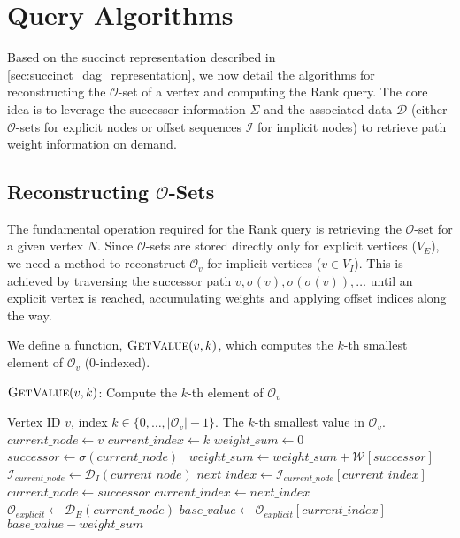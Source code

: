 \section{Query Algorithms}
\label{sec:query_algorithms}


Based on the succinct representation described in \autoref{sec:succinct_dag_representation}, we now detail the algorithms for reconstructing the $\mathcal{O}$-set of a vertex and computing the Rank query. The core idea is to leverage the successor information $\Sigma$ and the associated data $\mathcal{D}$ (either $\mathcal{O}$-sets for explicit nodes or offset sequences $\mathcal{I}$ for implicit nodes) to retrieve path weight information on demand.

\subsection{Reconstructing $\mathcal{O}$-Sets}
\label{subsec:reconstructing_o_sets}

The fundamental operation required for the Rank query is retrieving the $\mathcal{O}$-set for a given vertex $N$. Since $\mathcal{O}$-sets are stored directly only for explicit vertices ($V_E$), we need a method to reconstruct $\mathcal{O}_v$ for implicit vertices ($v \in V_I$). This is achieved by traversing the successor path $v, \sigma(v), \sigma(\sigma(v)), \dots$ until an explicit vertex is reached, accumulating weights and applying offset indices along the way.

We define a function, $\textsc{GetValue}(v, k)$, which computes the $k$-th smallest element of $\mathcal{O}_v$ (0-indexed).

\begin{algorithm}
    \caption{$\textsc{GetValue}(v, k)$: Compute the $k$-th element of $\mathcal{O}_v$}
    \label{alg:get_value}
    \small
    \begin{algorithmic}[1]
        \Require Vertex ID $v$, index $k \in \{0, \dots, |\mathcal{O}_v|-1\}$.
        \Ensure The $k$-th smallest value in $\mathcal{O}_v$.
        \State $current\_node \gets v$
        \State $current\_index \gets k$
        \State $weight\_sum \gets 0$
         
        \State $successor \gets \sigma(current\_node)$ \
        \State $weight\_sum \gets weight\_sum + \mathcal{W}[successor]$
        \State $\mathcal{I}_{current\_node} \gets \mathcal{D}_I(current\_node)$ 
        \State $next\_index \gets \mathcal{I}_{current\_node}[current\_index]$
        \State $current\_node \gets successor$
        \State $current\_index \gets next\_index$
        \EndWhile
        \State $\mathcal{O}_{explicit} \gets \mathcal{D}_E(current\_node)$
        \State $base\_value \gets \mathcal{O}_{explicit}[current\_index]$
        \State \Return $base\_value - weight\_sum$
    \end{algorithmic}
\end{algorithm}

